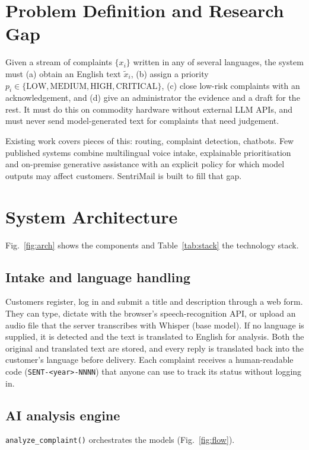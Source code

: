 \documentclass[conference]{IEEEtran}
\begin{document}
\section{Problem Definition and Research Gap}
Given a stream of complaints $\{x_i\}$ written in any of several languages, the system must (a) obtain an English text $\tilde{x}_i$, (b) assign a priority $p_i\in\{\text{LOW},\text{MEDIUM},\text{HIGH},\text{CRITICAL}\}$, (c) close low-risk complaints with an acknowledgement, and (d) give an administrator the evidence and a draft for the rest. It must do this on commodity hardware without external LLM APIs, and must never send model-generated text for complaints that need judgement.

Existing work covers pieces of this: routing, complaint detection, chatbots. Few published systems combine multilingual voice intake, explainable prioritisation and on-premise generative assistance with an explicit policy for which model outputs may affect customers. SentriMail is built to fill that gap.

\section{System Architecture}
Fig.~\ref{fig:arch} shows the components and Table~\ref{tab:stack} the technology stack.




\subsection{Intake and language handling}
Customers register, log in and submit a title and description through a web form. They can type, dictate with the browser's speech-recognition API, or upload an audio file that the server transcribes with Whisper (base model). If no language is supplied, it is detected and the text is translated to English for analysis. Both the original and translated text are stored, and every reply is translated back into the customer's language before delivery. Each complaint receives a human-readable code (\texttt{SENT-<year>-NNNN}) that anyone can use to track its status without logging in.

\subsection{AI analysis engine}
\texttt{analyze\_complaint()} orchestrates the models (Fig.~\ref{fig:flow}).
\end{document}
